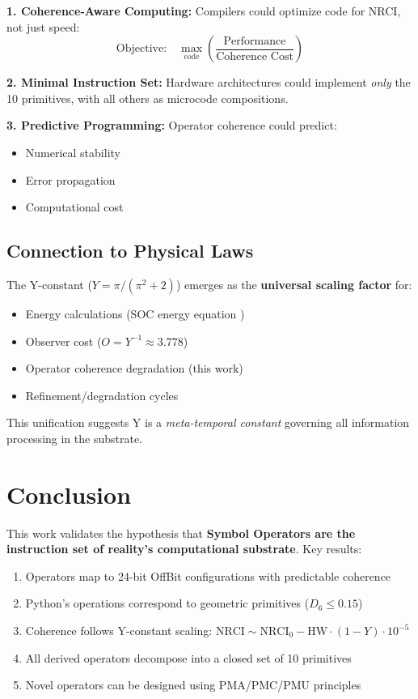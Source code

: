 \documentclass[12pt,a4paper]{article}
\begin{document}
\textbf{1. Coherence-Aware Computing:} Compilers could optimize code for NRCI, not just speed:
\begin{equation}
\text{Objective:} \quad \max_{\text{code}} \left(\frac{\text{Performance}}{\text{Coherence Cost}}\right)
\end{equation}

\textbf{2. Minimal Instruction Set:} Hardware architectures could implement \emph{only} the 10 primitives, with all others as microcode compositions.

\textbf{3. Predictive Programming:} Operator coherence could predict:
\begin{itemize}
    \item Numerical stability
    \item Error propagation
    \item Computational cost
\end{itemize}

\subsection{Connection to Physical Laws}

The Y-constant ($Y = \pi/(\pi^2 + 2)$) emerges as the \textbf{universal scaling factor} for:

\begin{itemize}
    \item Energy calculations (SOC energy equation \cite{UBP_3.5_Manual})
    \item Observer cost ($O = Y^{-1} \approx 3.778$)
    \item Operator coherence degradation (this work)
    \item Refinement/degradation cycles
\end{itemize}

This unification suggests Y is a \emph{meta-temporal constant} governing all information processing in the substrate.

\section{Conclusion}

This work validates the hypothesis that \textbf{Symbol Operators are the instruction set of reality's computational substrate}. Key results:

\begin{enumerate}
    \item Operators map to 24-bit OffBit configurations with predictable coherence
    \item Python's operations correspond to geometric primitives ($D_6 \leq 0.15$)
    \item Coherence follows Y-constant scaling: $\text{NRCI} \sim \text{NRCI}_0 - \text{HW} \cdot (1-Y) \cdot 10^{-5}$
    \item All derived operators decompose into a closed set of 10 primitives
    \item Novel operators can be designed using PMA/PMC/PMU principles
\end{enumerate}
\end{document}

